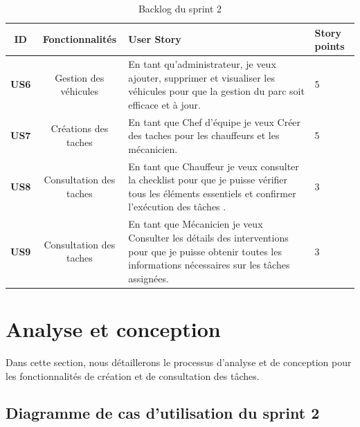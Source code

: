 \begin{table}[htbp]
  \centering
  \renewcommand{\arraystretch}{1.2} %
  \begin{tabular}{|c|c|p{7.8cm}|p{1cm}|}
    \hline
    \textbf{ID}  & \textbf{Fonctionnalités} & \centering \textbf{User Story}                                                                                                                                  & \textbf {Story points} \\
    \hline
    \textbf{US6} & Gestion des véhicules    & En tant qu'administrateur, je veux ajouter, supprimer et visualiser les véhicules pour que la gestion du parc soit efficace et à jour.                          & 5                      \\
    \hline
    \textbf{US7} & Créations des taches     & En tant que Chef d'équipe je veux Créer des taches pour les chauffeurs et les mécanicien.                                                                       & 5                      \\
    \hline
    \textbf{US8} & Consultation des taches  & En tant que Chauffeur je veux consulter la checklist pour que je puisse vérifier tous les éléments essentiels et confirmer l'exécution des tâches .             & 3                      \\
    \hline
    \textbf{US9} & Consultation des taches  & En tant que Mécanicien je veux Consulter les détails des interventions pour que je puisse obtenir toutes les informations nécessaires sur les tâches assignées. & 3                      \\
    \hline
  \end{tabular}
  \caption{Backlog du sprint 2}

\end{table}

\newpage
\section{Analyse et conception}

Dans cette section, nous détaillerons le processus d'analyse et de conception pour les fonctionnalités de création et de consultation des tâches.

\subsection{Diagramme de cas d’utilisation du sprint 2 }

